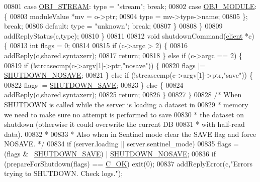 \begin{DoxyCode}
00801         \textcolor{keywordflow}{case} \hyperlink{server_8h_a2c2cc41300ca6b9daca7ea8a6d66edc6}{OBJ\_STREAM}: type = \textcolor{stringliteral}{"stream"}; \textcolor{keywordflow}{break};
00802         \textcolor{keywordflow}{case} \hyperlink{server_8h_a92c1fed85f709180fda0ff10d37d649b}{OBJ\_MODULE}: \{
00803             moduleValue *mv = o->ptr;
00804             type = mv->type->name;
00805         \}; \textcolor{keywordflow}{break};
00806         \textcolor{keywordflow}{default}: type = \textcolor{stringliteral}{"unknown"}; \textcolor{keywordflow}{break};
00807         \}
00808     \}
00809     addReplyStatus(c,type);
00810 \}
00811 
00812 \textcolor{keywordtype}{void} shutdownCommand(\hyperlink{structclient}{client} *c) \{
00813     \textcolor{keywordtype}{int} flags = 0;
00814 
00815     \textcolor{keywordflow}{if} (c->argc > 2) \{
00816         addReply(c,shared.syntaxerr);
00817         \textcolor{keywordflow}{return};
00818     \} \textcolor{keywordflow}{else} \textcolor{keywordflow}{if} (c->argc == 2) \{
00819         \textcolor{keywordflow}{if} (!strcasecmp(c->argv[1]->ptr,\textcolor{stringliteral}{"nosave"})) \{
00820             flags |= \hyperlink{server_8h_a834b7e50f783a1eeaa1feea05fce199e}{SHUTDOWN\_NOSAVE};
00821         \} \textcolor{keywordflow}{else} \textcolor{keywordflow}{if} (!strcasecmp(c->argv[1]->ptr,\textcolor{stringliteral}{"save"})) \{
00822             flags |= \hyperlink{server_8h_ada761b94960fa20ff86d56b403b26861}{SHUTDOWN\_SAVE};
00823         \} \textcolor{keywordflow}{else} \{
00824             addReply(c,shared.syntaxerr);
00825             \textcolor{keywordflow}{return};
00826         \}
00827     \}
00828     \textcolor{comment}{/* When SHUTDOWN is called while the server is loading a dataset in}
00829 \textcolor{comment}{     * memory we need to make sure no attempt is performed to save}
00830 \textcolor{comment}{     * the dataset on shutdown (otherwise it could overwrite the current DB}
00831 \textcolor{comment}{     * with half-read data).}
00832 \textcolor{comment}{     *}
00833 \textcolor{comment}{     * Also when in Sentinel mode clear the SAVE flag and force NOSAVE. */}
00834     \textcolor{keywordflow}{if} (server.loading || server.sentinel\_mode)
00835         flags = (flags & ~\hyperlink{server_8h_ada761b94960fa20ff86d56b403b26861}{SHUTDOWN\_SAVE}) | \hyperlink{server_8h_a834b7e50f783a1eeaa1feea05fce199e}{SHUTDOWN\_NOSAVE};
00836     \textcolor{keywordflow}{if} (prepareForShutdown(flags) == \hyperlink{server_8h_a303769ef1065076e68731584e758d3e1}{C\_OK}) exit(0);
00837     addReplyError(c,\textcolor{stringliteral}{"Errors trying to SHUTDOWN. Check logs."});

\end{DoxyCode}
